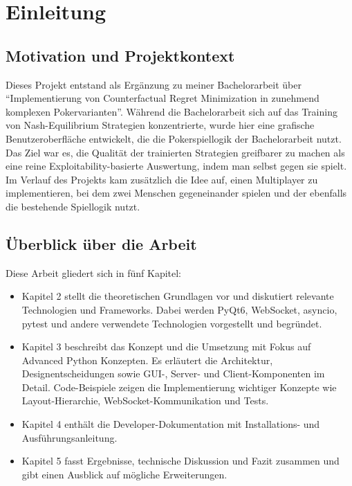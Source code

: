 \section{Einleitung}\label{sec:einleitung}

\subsection{Motivation und Projektkontext}

Dieses Projekt entstand als Ergänzung zu meiner Bachelorarbeit über \enquote{Implementierung von Counterfactual Regret Minimization in zunehmend komplexen Pokervarianten}.
Während die Bachelorarbeit sich auf das Training von Nash-Equilibrium Strategien konzentrierte, wurde hier eine grafische Benutzeroberfläche entwickelt, die die Pokerspiellogik der Bachelorarbeit nutzt.
Das Ziel war es, die Qualität der trainierten Strategien greifbarer zu machen als eine reine Exploitability-basierte Auswertung, indem man selbst gegen sie spielt.
Im Verlauf des Projekts kam zusätzlich die Idee auf, einen Multiplayer zu implementieren, bei dem zwei Menschen gegeneinander spielen und der ebenfalls die bestehende Spiellogik nutzt.

\subsection{Überblick über die Arbeit}

Diese Arbeit gliedert sich in fünf Kapitel:

\begin{itemize}
    \item Kapitel 2 stellt die theoretischen Grundlagen vor und diskutiert relevante Technologien und Frameworks.
    Dabei werden PyQt6, WebSocket, asyncio, pytest und andere verwendete Technologien vorgestellt und begründet.
    
    \item Kapitel 3 beschreibt das Konzept und die Umsetzung mit Fokus auf Advanced Python Konzepten.
    Es erläutert die Architektur, Designentscheidungen sowie GUI-, Server- und Client-Komponenten im Detail.
    Code-Beispiele zeigen die Implementierung wichtiger Konzepte wie Layout-Hierarchie, WebSocket-Kommunikation und Tests.
    
    \item Kapitel 4 enthält die Developer-Dokumentation mit Installations- und Ausführungsanleitung.
    
    \item Kapitel 5 fasst Ergebnisse, technische Diskussion und Fazit zusammen und gibt einen Ausblick auf mögliche Erweiterungen.
\end{itemize}
